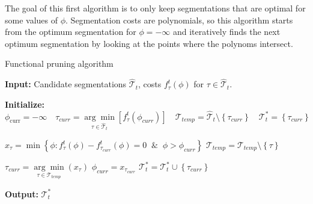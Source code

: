 \documentclass[11pt]{article}
\begin{document}
The goal of this first algorithm is to only keep segmentations that are optimal for some values of $\phi$. Segmentation costs are polynomials, so this algorithm starts from the optimum segmentation for $\phi=-\infty$ and iteratively finds the next optimum segmentation by looking at the points where the polynoms intersect.
\begin{algorithm}[H]
    \caption{Functional pruning algorithm}
    \begin{algorithmic}[1]
        \State \textbf{Input:} Candidate segmentations $\hat{\mathcal{T}}_{t}$, costs $f^{t}_{{\tau}}(\phi)$ for ${\tau}\in\hat{\mathcal{T}}_{t}$.

        \State \textbf{Initialize:} $\phi_\text{curr}=-\infty \quad {\tau}_{curr}=\underset{{\tau}\in\hat{\mathcal{T}}_{t}}{ \arg\min}\left[f^{t}_{{\tau}}(\phi_{curr})\right]\quad \mathcal{T}_{temp}=\hat{\mathcal{T}}_{t}\setminus \left\{\tau_{curr}\right\}\quad \mathcal{T}^*_t=\left\{\tau_{curr}\right\}$


        \State $x_{\tau}=\min\left\{\phi:f^{t}_{\tau}(\phi)-f^{t}_{{\tau}_{curr}}(\phi)=0\;\;\&\;\;\phi>\phi_{curr}\right\}$
        \State $\mathcal{T}_{temp}=\mathcal{T}_{temp}\setminus\left\{\tau\right\}$
        \EndIf
        \EndFor

        \State $\tau_{curr}=\underset{\tau\in\mathcal{T}_{temp}}{\arg\min}(x_{\tau})$
        \State $\phi_{curr}=x_{\tau_{curr}}$
        \State $\mathcal{T}^*_t=\mathcal{T}^*_t\cup\left\{\tau_{curr}\right\}$
        \EndWhile

        \State \textbf{Output:} $\mathcal{T}^*_t$
    \end{algorithmic}
\end{algorithm}
\end{document}
